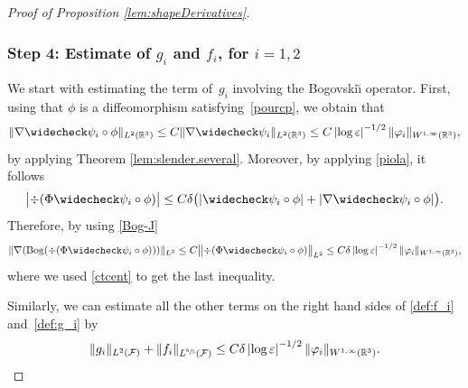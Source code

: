 \documentclass[10pt]{amsart}
\newcommand{\R}{\mathbb{R}}
\let\eps\varepsilon
\DeclareMathOperator{\Bog}{Bog}
\theoremstyle{definition}
\theoremstyle{remark}
\begin{document}
\begin{proof}[Proof of Proposition \ref{lem:shapeDerivatives}]
\subsubsection*{Step 4: Estimate of $g_i$ and $f_i$, for $i=1,2$}
We start with estimating the term of~$g_i$ involving the Bogovski\u{\i} operator.
First, using that
$\phi$ is a diffeomorphism satisfying~\eqref{pourcp},
we obtain that
\begin{equation} \label{ctcent}
\|\nabla \widecheck \psi_i \circ \phi\|_{L^2(\R^3)} \leq C \|\nabla \widecheck \psi_i\|_{L^2(\R^3)} \leq C \left|\log \eps\right|^{-1/2} \|\varphi_i\|_{W^{1,\infty}(\R^3)},
\end{equation}
by applying Theorem \ref{lem:slender.several}.
Moreover, by applying \eqref{piola}, it follows
\begin{equation} \label{giro}
\bigl|\div (\Phi \widecheck \psi_i \circ \phi)\bigr|
\leq C {\delta} \bigl(|\widecheck \psi_i \circ \phi|
+ |\nabla \widecheck \psi_i \circ \phi|\bigr).
\end{equation}
Therefore, by using \eqref{Bog-J}
\begin{equation*}
\|\nabla(\Bog(\div(\Phi \widecheck \psi_i \circ \phi)))\|_{L^2} \leq C
\bigl\|\div(\Phi \widecheck \psi_i \circ \phi)\bigr\|_{L^2}
\leq C \delta \left|\log \eps\right|^{-1/2} \|\varphi_i\|_{W^{1,\infty}(\R^3)},
\end{equation*}
where we used
\eqref{ctcent} to get the last inequality.

Similarly, we can estimate all the other terms on the right hand sides of \eqref{def:f_i} and~\eqref{def:g_i} by
\begin{equation} \label{midi4}
\|g_i\|_{L^2(\mathcal F)} + \|f_i\|_{L^{\sfrac 6 5 }(\mathcal F)} \leq C \delta \left|\log \eps\right|^{-1/2} \| \varphi_i\|_{W^{1,\infty}(\R^3)}.
\end{equation}


\end{proof}
\end{document}
